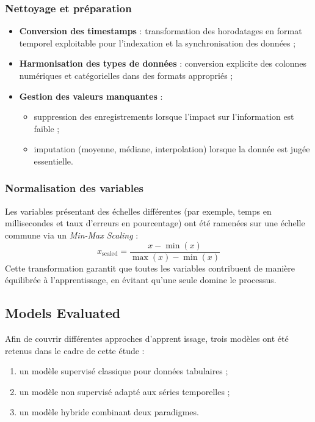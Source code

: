 \documentclass[conference]{IEEEtran}
\begin{document}
\subsubsection{Nettoyage et préparation}
\begin{itemize}
    \item \textbf{Conversion des timestamps} : transformation des horodatages en format temporel exploitable pour l’indexation et la synchronisation des données ;
    \item \textbf{Harmonisation des types de données} : conversion explicite des colonnes numériques et catégorielles dans des formats appropriés ;
    \item \textbf{Gestion des valeurs manquantes} :
    \begin{itemize}
        \item suppression des enregistrements lorsque l’impact sur l’information est faible ;
        \item imputation (moyenne, médiane, interpolation) lorsque la donnée est jugée essentielle.
    \end{itemize}
\end{itemize}

\subsubsection{Normalisation des variables}
Les variables présentant des échelles différentes (par exemple, temps en millisecondes et taux d’erreurs en pourcentage) ont été ramenées sur une échelle commune via un \textit{Min-Max Scaling} :
\[
x_{\text{scaled}} = \frac{x - \min(x)}{\max(x) - \min(x)}
\]
Cette transformation garantit que toutes les variables contribuent de manière équilibrée à l’apprentissage, en évitant qu’une seule domine le processus.

\subsection{Models Evaluated}

Afin de couvrir différentes approches d’apprent issage, trois modèles ont été retenus dans le cadre de cette étude :  
\begin{enumerate}
    \item un modèle supervisé classique pour données tabulaires ;
    \item un modèle non supervisé adapté aux séries temporelles ;
    \item un modèle hybride combinant deux paradigmes.
\end{enumerate}
\end{document}
